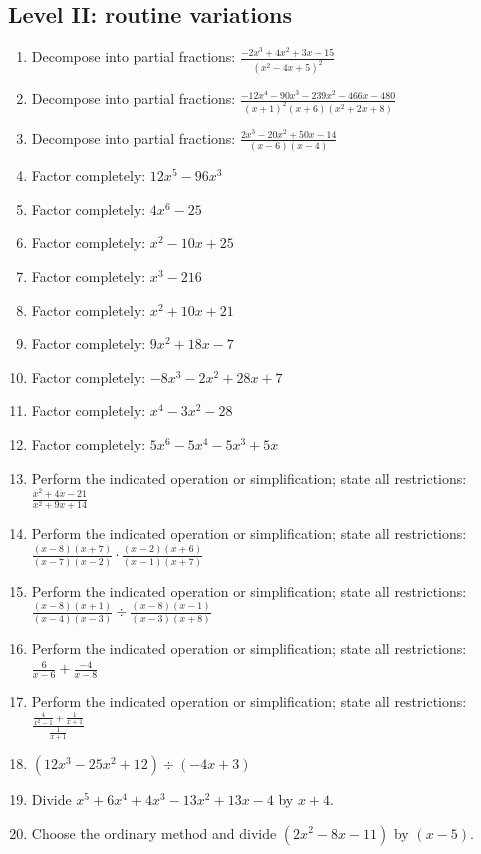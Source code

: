 \documentclass[11pt,oneside]{book}
\begin{document}
\subsection*{Level II: routine variations}
\begin{enumerate}[leftmargin=*,label=\textbf{\arabic*.},itemsep=0.65\baselineskip]
\item Decompose into partial fractions: $\displaystyle \frac{- 2 x^{3} + 4 x^{2} + 3 x - 15}{\left(x^{2} - 4 x + 5\right)^{2}}$
\item Decompose into partial fractions: $\displaystyle \frac{- 12 x^{4} - 90 x^{3} - 239 x^{2} - 466 x - 480}{\left(x + 1\right)^{2} \left(x + 6\right) \left(x^{2} + 2 x + 8\right)}$
\item Decompose into partial fractions: $\displaystyle \frac{2 x^{3} - 20 x^{2} + 50 x - 14}{\left(x - 6\right) \left(x - 4\right)}$
\item Factor completely: $ 12 x^{5} - 96 x^{3} $
\item Factor completely: $ 4 x^{6} - 25 $
\item Factor completely: $ x^{2} - 10 x + 25 $
\item Factor completely: $ x^{3} - 216 $
\item Factor completely: $ x^{2} + 10 x + 21 $
\item Factor completely: $ 9 x^{2} + 18 x - 7 $
\item Factor completely: $ - 8 x^{3} - 2 x^{2} + 28 x + 7 $
\item Factor completely: $ x^{4} - 3 x^{2} - 28 $
\item Factor completely: $ 5 x^{6} - 5 x^{4} - 5 x^{3} + 5 x $
\item Perform the indicated operation or simplification; state all restrictions: $\displaystyle \frac{x^{2} + 4 x - 21}{x^{2} + 9 x + 14}$
\item Perform the indicated operation or simplification; state all restrictions: $\displaystyle \frac{\left(x - 8\right) \left(x + 7\right)}{\left(x - 7\right) \left(x - 2\right)}\cdot\frac{\left(x - 2\right) \left(x + 6\right)}{\left(x - 1\right) \left(x + 7\right)}$
\item Perform the indicated operation or simplification; state all restrictions: $\displaystyle \frac{\left(x - 8\right) \left(x + 1\right)}{\left(x - 4\right) \left(x - 3\right)}\div\frac{\left(x - 8\right) \left(x - 1\right)}{\left(x - 3\right) \left(x + 8\right)}$
\item Perform the indicated operation or simplification; state all restrictions: $\displaystyle \frac{6}{x - 6}+\frac{-4}{x - 8}$
\item Perform the indicated operation or simplification; state all restrictions: $\displaystyle \frac{\frac{4}{x^{2} - 1} + \frac{1}{x + 1}}{\frac{1}{x + 1}}$
\item $\displaystyle (12 x^{3} - 25 x^{2} + 12)\div(- 4 x + 3)$
\item Divide $ x^{5} + 6 x^{4} + 4 x^{3} - 13 x^{2} + 13 x - 4 $ by $x + 4$.
\item Choose the ordinary method and divide $(2 x^{2} - 8 x - 11)$ by $(x - 5)$.
\end{enumerate}
\end{document}
